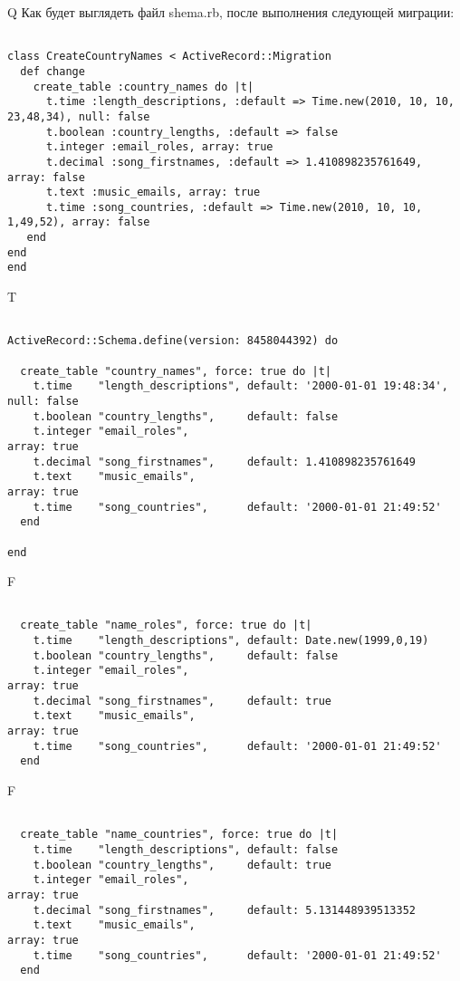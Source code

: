 Q
Как будет выглядеть файл shema.rb, после выполнения следующей миграции:

\begin{verbatim}

class CreateCountryNames < ActiveRecord::Migration 
  def change 
    create_table :country_names do |t| 
      t.time :length_descriptions, :default => Time.new(2010, 10, 10, 23,48,34), null: false
      t.boolean :country_lengths, :default => false
      t.integer :email_roles, array: true
      t.decimal :song_firstnames, :default => 1.410898235761649, array: false
      t.text :music_emails, array: true
      t.time :song_countries, :default => Time.new(2010, 10, 10, 1,49,52), array: false
   end
end
end
\end{verbatim}

T
\begin{verbatim}

ActiveRecord::Schema.define(version: 8458044392) do

  create_table "country_names", force: true do |t|
    t.time    "length_descriptions", default: '2000-01-01 19:48:34', null: false
    t.boolean "country_lengths",     default: false
    t.integer "email_roles",                                                      array: true
    t.decimal "song_firstnames",     default: 1.410898235761649
    t.text    "music_emails",                                                     array: true
    t.time    "song_countries",      default: '2000-01-01 21:49:52'
  end

end
\end{verbatim}


F
\begin{verbatim}

  create_table "name_roles", force: true do |t|
    t.time    "length_descriptions", default: Date.new(1999,0,19)
    t.boolean "country_lengths",     default: false
    t.integer "email_roles",                                                      array: true
    t.decimal "song_firstnames",     default: true
    t.text    "music_emails",                                                     array: true
    t.time    "song_countries",      default: '2000-01-01 21:49:52'
  end

\end{verbatim}

F
\begin{verbatim}

  create_table "name_countries", force: true do |t|
    t.time    "length_descriptions", default: false
    t.boolean "country_lengths",     default: true
    t.integer "email_roles",                                                      array: true
    t.decimal "song_firstnames",     default: 5.131448939513352
    t.text    "music_emails",                                                     array: true
    t.time    "song_countries",      default: '2000-01-01 21:49:52'
  end

\end{verbatim}


